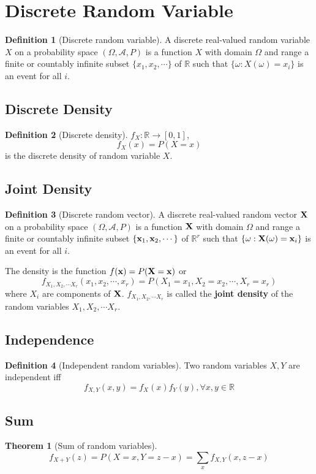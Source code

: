\documentclass[10pt, a4paper]{extarticle}
\theoremstyle{definition}
\newtheorem{thm}{Theorem}
\newtheorem{defn}{Definition}
\begin{document}
	\section{Discrete Random Variable}
	\begin{defn}[Discrete random variable]
		A discrete real-valued random variable $X$ on a probability space $(\Omega,\mathscr{A},P)$ is a function $X$ with domain $\Omega$ and range a
		finite or countably infinite subset $\{x_1,x_2,\cdots\}$ of $\mathbb{R}$
		such that $\{\omega : X(\omega) = x_i\}$ is an event for all $i$.
	\end{defn}
	
	\subsection{Discrete Density}
	\begin{defn}[Discrete density]
		$f_X:\mathbb{R}\to[0,1]$,
		\[f_X(x)=P(X=x)\]
		is the discrete density of random variable $X$.
	\end{defn}

	\subsection{Joint Density}
	\begin{defn}[Discrete random vector]
		A discrete real-valued random vector $\vb{X}$ on a probability space $(\Omega,\mathscr{A},P)$ is a function $\vb{X}$ with domain $\Omega$ and range a
	finite or countably infinite subset $\{\vb{x}_1,\vb{x}_2,\cdots\}$ of $\mathbb{R}^r$
		such that $\{\omega : \vb{X}(\omega) = \vb{x}_i\}$ is an event for all $i$.

		The density is the function $f(\vb{x})=P(\vb{X}=\vb{x})$ or 
		\[f_{X_1,X_2,\cdots X_r}(x_1,x_2,\cdots,x_r)=P(X_1=x_1,X_2=x_2,\cdots,X_r=x_r)\] where $X_i$ are components of $\vb{X}$. $f_{X_1,X_2,\cdots X_r}$ is called the \textbf{joint density} of the random variables $X_1,X_2,\cdots X_r$.
	\end{defn}

	\subsection{Independence}
	\begin{defn}[Independent random variables]
		Two random variables $X,Y$ are independent iff
		\[f_{X,Y}(x,y)=f_X(x)f_Y(y),\forall x,y\in\mathbb{R}\]
	\end{defn}
	
	\subsection{Sum}
	\begin{thm}[Sum of random variables]
		\[f_{X+Y}(z)=P(X=x,Y=z-x)=\sum_x f_{X,Y}(x,z-x)\]
	\end{thm}
\end{document}
